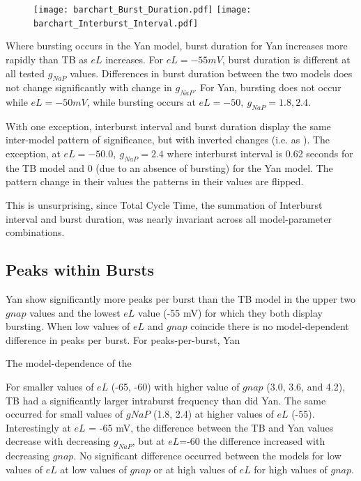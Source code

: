\documentclass[11pt]{article}
\begin{document}
 \begin{figure}[h]
	\centering
	\texttt{[image: barchart\_Burst\_Duration.pdf]}
	\texttt{[image: barchart\_Interburst\_Interval.pdf]}
	\caption{}
	\label{fig:bcBD}
\end{figure}

Where bursting occurs in the Yan model, burst duration for Yan increases more rapidly than TB as $eL$ increases. For $eL=-55 mV$, burst duration is different at all tested $g_{NaP}$ values.
Differences in burst duration between the two models does not change significantly with change in $g_{NaP}$. For Yan, bursting does not occur while $eL = -50 mV$, while bursting occurs at $eL=-50,\  g_{NaP}=1.8, 2.4$. 

With one exception, interburst interval and burst duration display the same inter-model pattern of significance, but with inverted changes (i.e. as ). The exception, at $eL=-50.0,\ g_{NaP} = 2.4$ where interburst interval is 0.62 seconds for the TB model and 0 (due to an absence of bursting) for the Yan model. 
The pattern change in their values 
the patterns in their values are flipped.

This is unsurprising, since Total Cycle Time, the summation of Interburst interval and burst duration, was nearly invariant across all model-parameter combinations. 

\subsection{Peaks within Bursts}
Yan show significantly more peaks per burst than the TB model in the upper two $gnap$ values and the lowest $eL$ value (-55 mV) for which they both display bursting. When low values of $eL$ and $gnap$ coincide there is no model-dependent difference in peaks per burst.
For peaks-per-burst, Yan 

The model-dependence of the 

For smaller values of $eL$ (-65, -60) with higher value of $gnap$ (3.0, 3.6, and 4.2), TB had a significantly larger intraburst frequency than did Yan. The same occurred for small values of $gNaP$ (1.8, 2.4) at higher values of $eL$ (-55). Interestingly at $eL$ = -65 mV, the difference between the TB and Yan values decrease with decreasing $g_{NaP}$, but at $eL$=-60 the difference increased with decreasing $gnap$. No significant difference occurred between the models for low values of $eL$ at low values of $gnap$ or at high values of $eL$ for high values of $gnap$.
\end{document}
